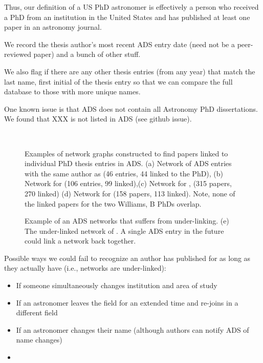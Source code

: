 \documentclass{emulateapj}
\begin{document}
Thus, our definition of a US PhD astronomer is effectively a person who received a PhD from an institution in the United States and has published at least one paper in an astronomy journal.

We record the thesis author's most recent ADS entry date (need not be a peer-reviewed paper)  and a bunch of other stuff.

We also flag if there are any other thesis entries (from any year) that match the last name, first initial of the thesis entry so that we can compare the full database to those with more unique names.

One known issue is that ADS does not contain all Astronomy PhD dissertations. We found that XXX is not listed in ADS (see github issue).


\begin{figure*}
  \\
        \caption{Examples of network graphs constructed to find papers linked to individual PhD thesis entries in ADS.   (a) Network of ADS entries with the same author as \citet{Yoachim07} (46 entries, 44 linked to the PhD), (b) Network for \citet{Bellm2011} (106 entries, 99 linked),(c) Network for \citet{Williams02}, (315 papers, 270 linked) (d) Network for \citet{Williams11} (158 papers, 113 linked).  Note, none of the linked papers for the two Williams, B PhDs overlap. \label{fig:example_networks}}
\end{figure*}

\begin{figure}
  \caption{Example of an ADS networks that suffers from under-linking.  (e) The under-linked network of \citet{Capelo12}.  A single ADS entry in the future could link a network back together.}
\end{figure}


Possible ways we could fail to recognize an author has published for as long as they actually have (i.e., networks are under-linked):
\begin{itemize}
\item{If someone simultaneously changes institution and area of study}
  \item{If an astronomer leaves the field for an extended time and re-joins in a different field}
\item{If an astronomer changes their name (although authors can notify ADS of name changes)}
  \item{}
\end{itemize}
\end{document}
